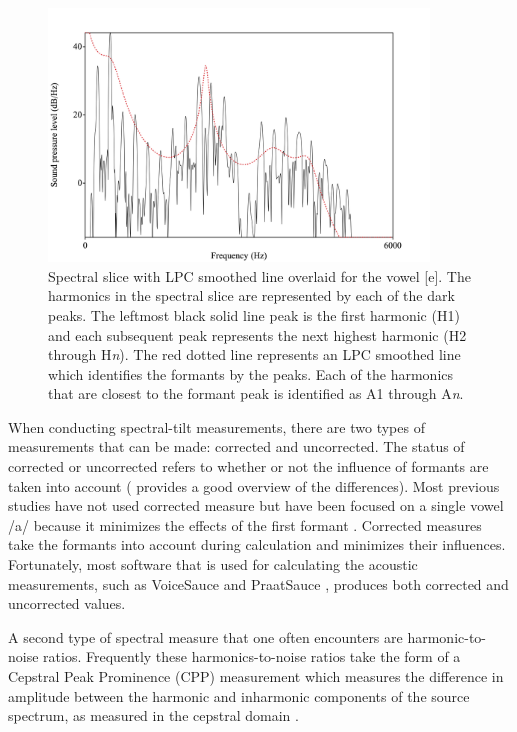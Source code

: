\documentclass[12pt, letterpaper]{article}
\begin{document}
\begin{figure}[!h]
	\centering
	\includegraphics[width=0.9\textwidth]{../Harmonics.png}
	\caption{Spectral slice with LPC smoothed line overlaid for the vowel [e]. The harmonics in the spectral slice are represented by each of the dark peaks. The leftmost black solid line peak is the first harmonic (H1) and each subsequent peak represents the next highest harmonic (H2 through H\textit{n}). The red dotted line represents an LPC smoothed line which identifies the formants by the peaks. Each of the harmonics that are closest to the formant peak is identified as A1 through A\textit{n}.}
	\label{fig:Harmonics}
\end{figure}

When conducting spectral-tilt measurements, there are two types of measurements that can be made: corrected and uncorrected. The status of corrected or uncorrected refers to whether or not the influence of formants are taken into account (\cite{garellekPhoneticsVoice2019} provides a good overview of the differences). Most previous studies have not used corrected measure but have been focused on a single vowel /a/ because it minimizes the effects of the first formant \citep{espositoVariationContrastivePhonation2010}. Corrected measures take the formants into account during calculation and minimizes their influences. Fortunately, most software that is used for calculating the acoustic measurements, such as VoiceSauce \citep{shueVOICESAUCEProgramVoice2009} and PraatSauce \citep{kirbyPraatSauce2022}, produces both corrected and uncorrected values. 

A second type of spectral measure that one often encounters are harmonic-to-noise ratios. Frequently these harmonics-to-noise ratios take the form of a Cepstral Peak Prominence (CPP) measurement which measures the difference in amplitude between the harmonic and inharmonic components of the source spectrum, as measured in the cepstral domain \citep{dekromCepstrumBasedTechniqueDetermining1993}. 
\end{document}
